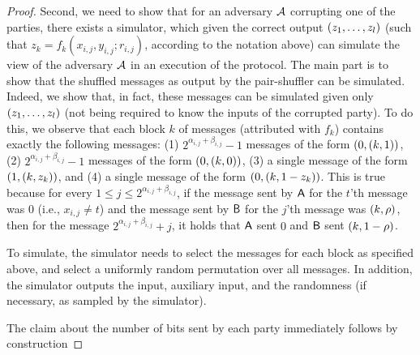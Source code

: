 \begin{proof}
Second, we need to show that for an adversary $\mathcal{A}$ corrupting one of the parties, there exists a simulator, which given the correct output $\left(z_1, \ldots, z_l\right)$ (such that $z_k = f_k(x_{i,j}, y_{i,j};r_{i,j})$, according to the notation above) can simulate the view of the adversary $\mathcal{A}$ in an execution of the protocol. The main part is to show that the shuffled messages as output by the pair-shuffler can be simulated. Indeed, we show that, in fact, these messages can be simulated given only $\left(z_1, \ldots, z_l\right)$ (not being required to know the inputs of the corrupted party). To do this, we observe that each block $k$ of messages (attributed with $f_k$) contains exactly the following messages: (1)  $2^{\alpha_{i,j}+\beta_{i,j}}-1$ messages of the form $\left( 0,\left(k,1\right)\right)$, (2)  $2^{\alpha_{i,j}+\beta_{i,j}}-1$ messages of the form $\left( 0,\left(k,0\right)\right)$, (3)  a single message of the form $\left( 1,\left(k,z_k\right)\right)$, and (4)  a single message of the form $\left( 0,\left(k,1-z_k\right)\right)$. This is true because for every $1\le j \le2^{\alpha_{i,j}+\beta_{i,j}}$, if the message sent by $\mathsf{A}$ for the $t$'th message was $0$ (i.e., $x_{i,j}\neq t$) and the message sent by $\mathsf{B}$ for the $j$'th message was $\left(k,\rho\right)$, then for the message $2^{\alpha_{i,j}+\beta_{i,j}}+j$, it holds that $\mathsf{A}$ sent $0$ and $\mathsf{B}$ sent $\left(k,1-\rho\right)$.

To simulate, the simulator needs to select the messages for each block as specified above, and select a uniformly random permutation over all messages. In addition, the simulator outputs the input, auxiliary input, and the randomness (if necessary, as sampled by the simulator).


The claim about the number of bits sent by each party immediately follows by construction
\end{proof}

